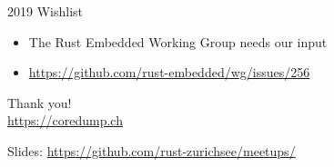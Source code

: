 \documentclass[aspectratio=1610,14pt,t]{beamer}
\begin{document}
\begin{frame}[c]{2019 Wishlist}
  \begin{itemize}
    \item The Rust Embedded Working Group needs our input
    \item \url{https://github.com/rust-embedded/wg/issues/256}
  \end{itemize}
\end{frame}


{
\begin{frame}[standout]
  \begin{centering}
    {\Huge Thank you!}\\
    {\normalsize \url{https://coredump.ch}}\\
  \end{centering}
  {\small Slides: \url{https://github.com/rust-zurichsee/meetups/}}\\
  \vspace{3cm}
\end{frame}
}
\end{document}
